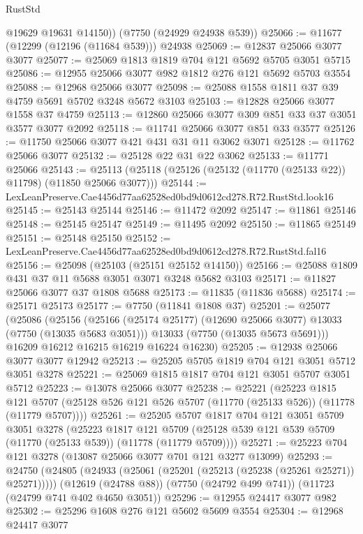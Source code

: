 \begin{lexlean}{RustStd}
\begin{coremodule}
        @19629
        @19631
        @14150))
    (@7750 (@24929 @24938 @539))
@25066 := @11677 (@12299 (@12196 (@11684 @539))) @24938
@25069 := @12837 @25066 @3077 @3077
@25077 := @25069 @1813 @1819 @704 @121 @5692 @5705 @3051 @5715
@25086 := @12955 @25066 @3077 @982 @1812 @276 @121 @5692 @5703 @3554
@25088 := @12968 @25066 @3077
@25098 := @25088 @1558 @1811 @37 @39 @4759 @5691 @5702 @3248 @5672 @3103
@25103 := @12828 @25066 @3077 @1558 @37 @4759
@25113 := @12860 @25066 @3077 @309 @851 @33 @37 @3051 @3577 @3077 @2092
@25118 := @11741 @25066 @3077 @851 @33 @3577
@25126 := @11750 @25066 @3077 @421 @431 @31 @11 @3062 @3071
@25128 := @11762 @25066 @3077
@25132 := @25128 @22 @31 @22 @3062
@25133 := @11771 @25066
@25143 := @25113 (@25118 (@25126 (@25132 (@11770 (@25133 @22)) @11798) (@11850 @25066 @3077)))
@25144 := LexLeanPreserve.Cae4456d77aa62528ed0bd9d0612cd278.R72.RustStd.look16
@25145 := @25143 @25144
@25146 := @11472 @2092
@25147 := @11861 @25146
@25148 := @25145 @25147
@25149 := @11495 @2092
@25150 := @11865 @25149
@25151 := @25148 @25150
@25152 := LexLeanPreserve.Cae4456d77aa62528ed0bd9d0612cd278.R72.RustStd.fal16
@25156 := @25098 (@25103 (@25151 @25152 @14150))
@25166 := @25088 @1809 @431 @37 @11 @5688 @3051 @3071 @3248 @5682 @3103
@25171 := @11827 @25066 @3077 @37 @1808 @5688
@25173 := @11835 (@11836 @5688)
@25174 := @25171 @25173
@25177 := @7750 (@11841 @1808 @37)
@25201 := @25077
    (@25086
      (@25156
        (@25166 (@25174 @25177) (@12690 @25066 @3077) @13033 (@7750 (@13035 @5683 @3051)))
        @13033
        (@7750 (@13035 @5673 @5691)))
      @16209
      @16212
      @16215
      @16219
      @16224
      @16230)
@25205 := @12938 @25066 @3077 @3077 @12942
@25213 := @25205 @5705 @1819 @704 @121 @3051 @5712 @3051 @3278
@25221 := @25069 @1815 @1817 @704 @121 @3051 @5707 @3051 @5712
@25223 := @13078 @25066 @3077
@25238 := @25221
    (@25223
      @1815
      @121
      @5707
      (@25128 @526 @121 @526 @5707 (@11770 (@25133 @526)) (@11778 (@11779 @5707))))
@25261 := @25205
    @5707
    @1817
    @704
    @121
    @3051
    @5709
    @3051
    @3278
    (@25223
      @1817
      @121
      @5709
      (@25128 @539 @121 @539 @5709 (@11770 (@25133 @539)) (@11778 (@11779 @5709))))
@25271 := @25223 @704 @121 @3278 (@13087 @25066 @3077 @701 @121 @3277 @13099)
@25293 := @24750
    (@24805 (@24933 (@25061 (@25201 (@25213 (@25238 (@25261 @25271)) @25271)))))
    (@12619 (@24788 @88))
    (@7750 (@24792 @499 @741))
    (@11723 (@24799 @741 @402 @4650 @3051))
@25296 := @12955 @24417 @3077 @982
@25302 := @25296 @1608 @276 @121 @5602 @5609 @3554
@25304 := @12968 @24417 @3077

\end{coremodule}
\end{lexlean}
